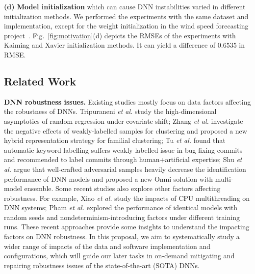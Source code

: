 \item {\textbf{(d) Model initialization}} which can cause DNN instabilities varied in different initialization methods. We performed the experiments with the same dataset and implementation, except for the weight initialization in the wind speed forecasting project~\cite{ghaderi2017deep}. 
Fig.~\ref{fig:motivation}(d) depicts the RMSEs of the experiments with Kaiming \cite{he2015delving} and Xavier initialization \cite{glorot2010understanding} methods. It can yield a difference of 0.6535 in RMSE.

\ei

\subsection{Related Work}

{\textbf{DNN robustness issues.}}
Existing studies mostly focus on data factors affecting the robustness of DNNs. Tripuraneni \textit{et al.} \cite{tripuraneni2021overparameterization} study the high-dimensional asymptotics of random regression under covariate shift; Zhang \textit{et al.} \cite{zhang2020familial} investigate the negative effects of weakly-labelled samples for clustering and proposed a new hybrid representation strategy for familial clustering; Tu \textit{et al.} \cite{tu2020better} found that automatic keyword labelling suffers weakly-labelled issue in bug-fixing commits and recommended to label commits through human+artificial expertise; Shu \textit{et al.} \cite{shu2022omni} argue that well-crafted adversarial samples heavily decrease the identification performance of DNN models and proposed a new Omni solution with multi-model ensemble. 
Some recent studies also explore other factors affecting robustness. For example, Xiao \textit{et al.} \cite{xiao2021nondeterministic} study the impacts of CPU multithreading on DNN systems; 
Pham \textit{et al.} \cite{pham2020problems} explored the performance of identical models with random seeds and nondeterminism-introducing factors under different training runs. These recent approaches provide some insights to understand the impacting factors on DNN robustness. 
In this proposal, we aim to systematically study a wider range of impacts of the data and software implementation and configurations, which will guide our later tasks in on-demand mitigating and repairing robustness issues of the state-of-the-art (SOTA) DNNs. 

